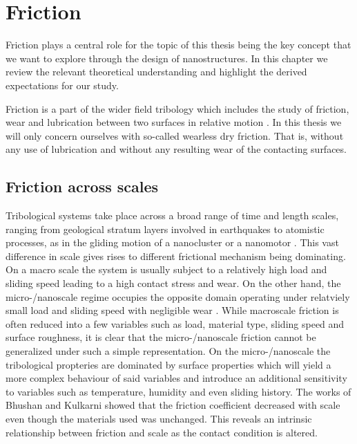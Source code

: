 





\chapter{Friction}\label{chap:friction} %
Friction plays a central role for the topic of this thesis being the key concept that we want to explore through the design of nanostructures. In this chapter we review the relevant theoretical understanding and highlight the derived expectations for our study.

Friction is a part of the wider field tribology which includes the study of
friction, wear and lubrication between two surfaces in relative motion \cite[p.
1]{gnecco_meyer_2015}. In this thesis we will only concern ourselves with so-called wearless dry friction. That is, without any use of lubrication and without any resulting wear of the contacting surfaces. 

\section{Friction across scales}
Tribological systems take place across a broad
range of time and length scales, ranging from geological stratum layers involved
in earthquakes \cite{kim_nano-scale_2009} to atomistic processes, as
in the gliding motion of a nanocluster or a nanomotor \cite{Manini_2016}. This
vast difference in scale gives rises to different frictional mechanism being
dominating. On a macro scale the system is usually subject
to a relatively high load and sliding speed leading to a high contact stress and
wear. On the other hand, the micro-/nanoscale regime occupies the opposite domain operating under relatviely small load and sliding speed with negligible wear \cite{kim_nano-scale_2009} \cite[p. 5]{bhushan_2013}. While macroscale friction is often reduced into a few variables such as load, material type, sliding speed and surface roughness, it is clear that the micro-/nanoscale friction cannot be generalized under such a simple representation. On the micro-/nanoscale the tribological propteries are dominated by surface properties which will yield a more complex behaviour of said variables and introduce an additional sensitivity to variables such as temperature, humidity and even sliding history. The works of Bhushan and Kulkarni \cite{BHUSHAN199649} showed that the friction coefficient decreased with scale even though the materials used was unchanged. This reveals an intrinsic relationship between friction and scale as the contact condition is altered.

